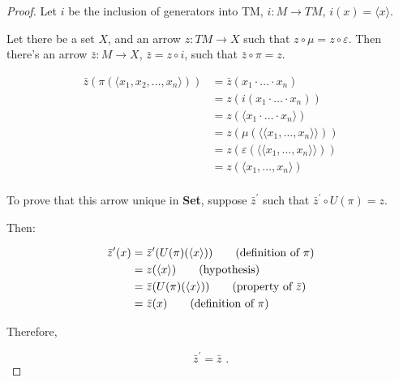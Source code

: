 \documentclass[a4paper,notitlepage]{article}
\begin{document}
\begin{enumerate}
\begin{proof}
        
        Let $i$ be the inclusion of generators into TM, $i : M → TM$,
        $i(x) = \langle x \rangle$.

        Let there be a set $X$, and an arrow $z : TM → X$ such that
        $z \circ μ = z \circ ε$. Then there's an arrow $\bar{z} : M → X$, $\bar{z} = z \circ i$,
        such that $\bar{z} \circ \pi = z$.

        \begin{align*}
          \bar{z}(\pi(\langle x_1, x_2, …, x_n \rangle))    &= \bar{z}(x_1 · … · x_n) \\
                                                           &= z(i(x_1 · … · x_n)) \\
                                                           &= z(\langle x_1 · … · x_n \rangle) \\
                                                           &= z(μ(\langle \langle x_1, …, x_n \rangle \rangle)) \\
                                                           &= z(ε(\langle \langle x_1, …, x_n \rangle \rangle)) \\
                                                           &= z(\langle x_1, …, x_n \rangle) \\
        \end{align*}

        To prove that this arrow unique in {\bf Set}, suppose
        $\bar{z}^\prime$ such that $\bar{z}^\prime \circ U(\pi) = z$.

        Then:

        \begin{align*}
          \bar{z}^\prime(x)   &= \bar{z}^\prime(U(\pi)(\langle x \rangle))  \tag{definition of $\pi$}\\
                            &= z(\langle x \rangle)                      \tag{hypothesis}          \\
                            &= \bar{z}(U(\pi)(\langle x \rangle))        \tag{property of $\bar{z}$}    \\
                            &= \bar{z}(x)                                \tag{definition of $\pi$}\\
        \end{align*}
 
        Therefore,

        $$\bar{z}^\prime = \bar{z}\text{ .}$$

        \end{proof}
\end{enumerate} 
\end{document}
